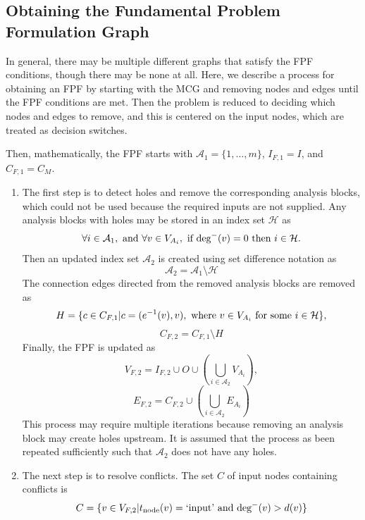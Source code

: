\subsection{Obtaining the Fundamental Problem Formulation Graph}
In general, there may be multiple different graphs that satisfy the FPF conditions, though there may be none at all. Here, we describe a process for obtaining an FPF by starting with the MCG and removing nodes and edges until the FPF conditions are met. Then the problem is reduced to deciding which nodes and edges to remove, and this is centered on the input nodes, which are treated as decision switches.

Then, mathematically, the FPF starts with $\mathcal A_1 = \{1,\ldots,m\}$, $I_{F,1} = I$, and $C_{F,1} = C_M$.



\begin{enumerate}
\item The first step is to detect holes and remove the corresponding analysis blocks, which could not be used because the required inputs are not supplied. Any analysis blocks with holes may be stored in an index set $\mathcal H$ as
\begin{equation}
\forall i \in \mathcal A_1,\textrm{ and }\forall v \in V_{A_i},\textrm{ if deg}^-(v)=0 \textrm{ then } i \in \mathcal H.
\end{equation}
Then an updated index set $\mathcal A_2$ is created using set difference notation as
\begin{equation}
\mathcal A_2 = \mathcal A_1 \setminus \mathcal H
\end{equation}The connection edges directed from the removed analysis blocks are removed as
\begin{equation}
H = \{c \in C_{F,1} |c = (e^{-1}(v),v), \textrm{ where } v \in V_{A_i} \textrm{ for some } i \in \mathcal H\},
\end{equation}
\begin{equation}
C_{F,2} = C_{F,1} \setminus H
\end{equation}
Finally, the FPF is updated as
\begin{equation}
V_{F,2} = I_{F,2} \cup O \cup \left( \bigcup_{i \in \mathcal A_2} V_{A_i} \right),
\end{equation}
\begin{equation}
E_{F,2} = C_{F,2} \cup \left( \bigcup_{i \in \mathcal A_2} E_{A_i} \right)
\end{equation}
This process may require multiple iterations because removing an analysis block may create holes upstream. It is assumed that the process as been repeated sufficiently such that $\mathcal A_2$ does not have any holes.

\item The next step is to resolve conflicts. The set $C$ of input nodes containing conflicts is
\begin{equation}
C = \{v \in V_{F,2} | t_\textrm{node}(v) = \textrm{`input'} \textrm{ and } \textrm{deg}^-(v) > d(v)\}
\end{equation}
\end{enumerate}

